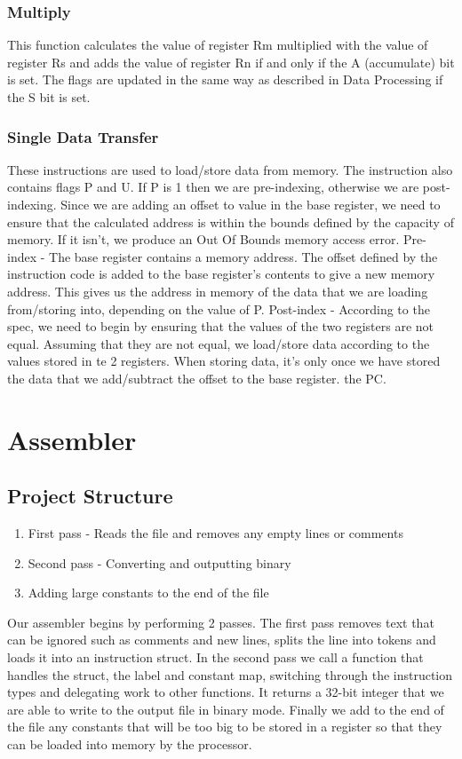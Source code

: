 \documentclass[a4paper]{article}
\begin{document}
\subsubsection{Multiply}

This function calculates the value of register Rm multiplied with the value of register Rs and adds the value of register Rn if and only if the A (accumulate) bit is set. The flags are updated in the same way as described in Data Processing if the S bit is set.

\subsubsection{Single Data Transfer}
These instructions are used to load/store data from memory. The instruction also contains flags P and U. If P is 1 then we are pre-indexing, otherwise we are post-indexing. Since we are adding an offset to value in the base register, we need to ensure that the calculated address is within the bounds defined by the capacity of memory. If it isn’t, we produce an Out Of Bounds memory access error.
Pre-index - The base register contains a memory address. The offset defined by the instruction code is added to the base register’s contents to give a new memory address. This gives us the address in memory of the data that we are loading from/storing into, depending on the value of P.
Post-index -  According to the spec, we need to begin by ensuring that the values of the two registers are not equal. Assuming that they are not equal, we load/store data according to the values stored in te 2 registers. When storing data, it’s only once we have stored the data that we add/subtract the offset to the base register.
the PC.

\section{Assembler}
\subsection{Project Structure}

\begin{enumerate}
\item First pass - Reads the file and removes any empty lines or comments
\item Second pass - Converting and outputting binary
\item Adding large constants to the end of the file
\end{enumerate}
Our assembler begins by performing 2 passes. The first pass removes text that can be ignored such as comments and new lines, splits the line into tokens and loads it into an instruction struct. In the second pass we call a function that handles the struct, the label and constant map, switching through the instruction types and delegating work to other functions. It returns a 32-bit integer that we are able to write to the output file in binary mode. Finally we add to the end of the file any constants that will be too big to be stored in a register so that they can be loaded into memory by the processor.
\end{document}
